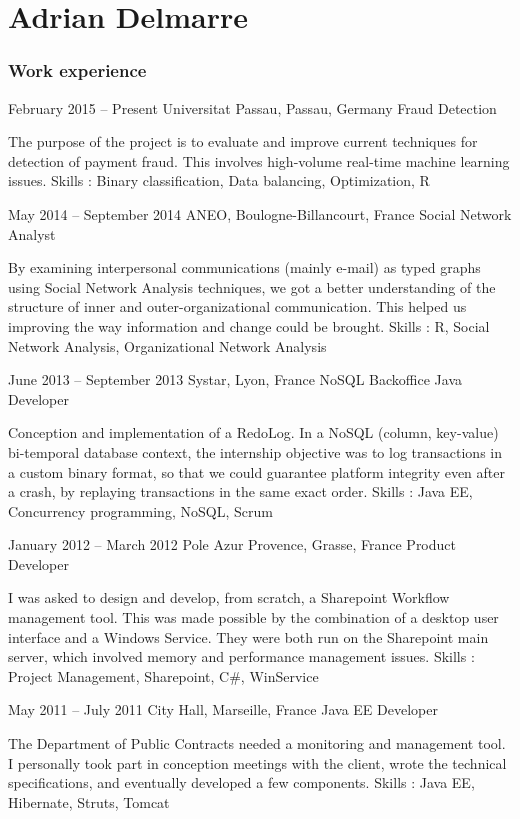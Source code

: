 \documentclass{tccv}
\begin{document}
\part{Adrian Delmarre}

\section{Work experience}

\begin{eventlist}

\item{February 2015 -- Present}
     {Universitat Passau, Passau, Germany}
     {Fraud Detection}
     
The purpose of the project is to evaluate and improve current techniques for detection of payment fraud. This involves high-volume real-time machine learning issues.
Skills : Binary classification, Data balancing, Optimization, R

\item{May 2014 -- September 2014}
     {ANEO, Boulogne-Billancourt, France}
     {Social Network Analyst}
     
By examining interpersonal communications (mainly e-mail) as typed graphs using Social Network Analysis techniques, we got a better understanding of the structure of inner and outer-organizational communication. This helped us improving the way information and change could be brought.
Skills : R, Social Network Analysis, Organizational Network Analysis

\item{June 2013 -- September 2013}
     {Systar, Lyon, France}
     {NoSQL Backoffice Java Developer}
     
Conception and implementation of a RedoLog.
In a NoSQL (column, key-value) bi-temporal database context, the internship objective was to log transactions in a custom binary format, so that we could guarantee platform integrity even after a crash, by replaying transactions in the same exact order.
Skills : Java EE, Concurrency programming, NoSQL, Scrum

\item{January 2012 -- March 2012}
     {Pole Azur Provence, Grasse, France}
     {Product Developer}
     
I was asked to design and develop, from scratch, a Sharepoint Workflow management tool. This was made possible by the combination of a desktop user interface and a Windows Service. They were both run on the Sharepoint main server, which involved memory and performance management issues.
Skills : Project Management, Sharepoint, C\#, WinService

\item{May 2011 -- July 2011}
     {City Hall, Marseille, France}
     {Java EE Developer}
     
The Department of Public Contracts needed a monitoring and management tool. I personally took part in conception meetings with the client, wrote the technical specifications, and eventually developed a few components.
Skills : Java EE, Hibernate, Struts, Tomcat

\end{eventlist}
\end{document}
